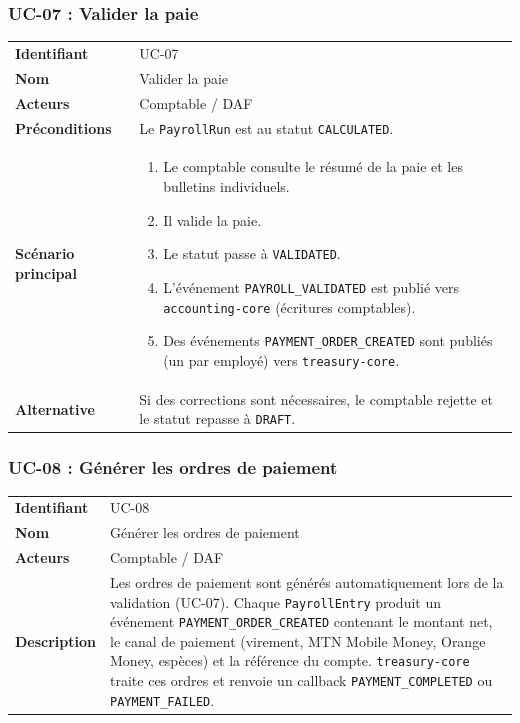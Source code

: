 \documentclass[a4paper,12pt,openany]{book}
\begin{document}
    \subsubsection*{UC-07 : Valider la paie}
    \begin{table}[H]
        \centering
        \begin{tabularx}{\textwidth}{lX}
    \toprule
    \textbf{Identifiant} & UC-07 \\
    \textbf{Nom}         & Valider la paie \\
    \textbf{Acteurs}     & Comptable / DAF \\
    \textbf{Préconditions} & Le \texttt{PayrollRun} est au statut \texttt{CALCULATED}. \\
    \midrule
    \textbf{Scénario principal} &
    \begin{enumerate}[nosep]
      \item Le comptable consulte le résumé de la paie et les bulletins individuels.
      \item Il valide la paie.
      \item Le statut passe à \texttt{VALIDATED}.
      \item L'événement \texttt{PAYROLL\_VALIDATED} est publié vers \texttt{accounting-core} (écritures comptables).
      \item Des événements \texttt{PAYMENT\_ORDER\_CREATED} sont publiés (un par employé) vers \texttt{treasury-core}.
    \end{enumerate} \\
    \textbf{Alternative} & Si des corrections sont nécessaires, le comptable rejette et le statut repasse à \texttt{DRAFT}. \\
    \bottomrule
        \end{tabularx}
    \end{table}

    \subsubsection*{UC-08 : Générer les ordres de paiement}
    \begin{table}[H]
        \centering
        \begin{tabularx}{\textwidth}{lX}
    \toprule
    \textbf{Identifiant} & UC-08 \\
    \textbf{Nom}         & Générer les ordres de paiement \\
    \textbf{Acteurs}     & Comptable / DAF \\
    \midrule
    \textbf{Description} & Les ordres de paiement sont générés automatiquement lors de la validation (UC-07). Chaque \texttt{PayrollEntry} produit un événement \texttt{PAYMENT\_ORDER\_CREATED} contenant le montant net, le canal de paiement (virement, MTN Mobile Money, Orange Money, espèces) et la référence du compte. \texttt{treasury-core} traite ces ordres et renvoie un callback \texttt{PAYMENT\_COMPLETED} ou \texttt{PAYMENT\_FAILED}. \\
    \bottomrule
        \end{tabularx}
    \end{table}
\end{document}
